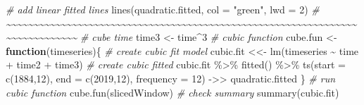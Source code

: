 \documentclass[
]{article}
\newenvironment{Shaded}{\begin{snugshade}}{\end{snugshade}}
\newcommand{\AttributeTok}[1]{\textcolor[rgb]{0.77,0.63,0.00}{#1}}
\newcommand{\CommentTok}[1]{\textcolor[rgb]{0.56,0.35,0.01}{\textit{#1}}}
\newcommand{\ControlFlowTok}[1]{\textcolor[rgb]{0.13,0.29,0.53}{\textbf{#1}}}
\newcommand{\DecValTok}[1]{\textcolor[rgb]{0.00,0.00,0.81}{#1}}
\newcommand{\FunctionTok}[1]{\textcolor[rgb]{0.00,0.00,0.00}{#1}}
\newcommand{\NormalTok}[1]{#1}
\newcommand{\OtherTok}[1]{\textcolor[rgb]{0.56,0.35,0.01}{#1}}
\newcommand{\SpecialCharTok}[1]{\textcolor[rgb]{0.00,0.00,0.00}{#1}}
\newcommand{\StringTok}[1]{\textcolor[rgb]{0.31,0.60,0.02}{#1}}
\begin{document}
\begin{Shaded}
\begin{Highlighting}[]
\CommentTok{\# add linear fitted lines}
\FunctionTok{lines}\NormalTok{(quadratic.fitted, }\AttributeTok{col =} \StringTok{"green"}\NormalTok{, }\AttributeTok{lwd =} \DecValTok{2}\NormalTok{)}
\CommentTok{\# \textasciitilde{}\textasciitilde{}\textasciitilde{}\textasciitilde{}\textasciitilde{}\textasciitilde{}\textasciitilde{}\textasciitilde{}\textasciitilde{}\textasciitilde{}\textasciitilde{}\textasciitilde{}\textasciitilde{}\textasciitilde{}\textasciitilde{}\textasciitilde{}\textasciitilde{}\textasciitilde{}\textasciitilde{}\textasciitilde{}\textasciitilde{}\textasciitilde{}\textasciitilde{}\textasciitilde{}\textasciitilde{}\textasciitilde{}\textasciitilde{}\textasciitilde{}\textasciitilde{}\textasciitilde{}\textasciitilde{}\textasciitilde{}\textasciitilde{}\textasciitilde{}\textasciitilde{}\textasciitilde{}\textasciitilde{}\textasciitilde{}\textasciitilde{}\textasciitilde{}\textasciitilde{}\textasciitilde{}\textasciitilde{}\textasciitilde{}\textasciitilde{}\textasciitilde{}\textasciitilde{}\textasciitilde{}\textasciitilde{}\textasciitilde{}\textasciitilde{}\textasciitilde{}\textasciitilde{}\textasciitilde{}\textasciitilde{}\textasciitilde{}\textasciitilde{}\textasciitilde{}\textasciitilde{}\textasciitilde{}\textasciitilde{}\textasciitilde{}\textasciitilde{}\textasciitilde{}\textasciitilde{}\textasciitilde{}\textasciitilde{}\textasciitilde{}\textasciitilde{}\textasciitilde{}\textasciitilde{}\textasciitilde{}\textasciitilde{}\textasciitilde{}\textasciitilde{}\textasciitilde{}\textasciitilde{}}
\CommentTok{\# cube time}
\NormalTok{time3 }\OtherTok{\textless{}{-}}\NormalTok{ time}\SpecialCharTok{\^{}}\DecValTok{3}
\CommentTok{\# cubic function}
\NormalTok{cube.fun }\OtherTok{\textless{}{-}} \ControlFlowTok{function}\NormalTok{(timeseries)\{}
  \CommentTok{\# create cubic fit model}
\NormalTok{  cubic.fit }\OtherTok{\textless{}\textless{}{-}} \FunctionTok{lm}\NormalTok{(timeseries }\SpecialCharTok{\textasciitilde{}}\NormalTok{ time }\SpecialCharTok{+}\NormalTok{ time2 }\SpecialCharTok{+}\NormalTok{ time3)}
  \CommentTok{\# create cubic fitted}
\NormalTok{  cubic.fit }\SpecialCharTok{\%\textgreater{}\%} \FunctionTok{fitted}\NormalTok{() }\SpecialCharTok{\%\textgreater{}\%} \FunctionTok{ts}\NormalTok{(}\AttributeTok{start =} \FunctionTok{c}\NormalTok{(}\DecValTok{1884}\NormalTok{,}\DecValTok{12}\NormalTok{), }\AttributeTok{end =} \FunctionTok{c}\NormalTok{(}\DecValTok{2019}\NormalTok{,}\DecValTok{12}\NormalTok{), }\AttributeTok{frequency =} \DecValTok{12}\NormalTok{) }\OtherTok{{-}\textgreater{}\textgreater{}} 
\NormalTok{    quadratic.fitted}
\NormalTok{\}}
\CommentTok{\# run cubic function}
\FunctionTok{cube.fun}\NormalTok{(slicedWindow)}
\CommentTok{\# check summary}
\FunctionTok{summary}\NormalTok{(cubic.fit)}
\end{Highlighting}
\end{Shaded}
\end{document}
